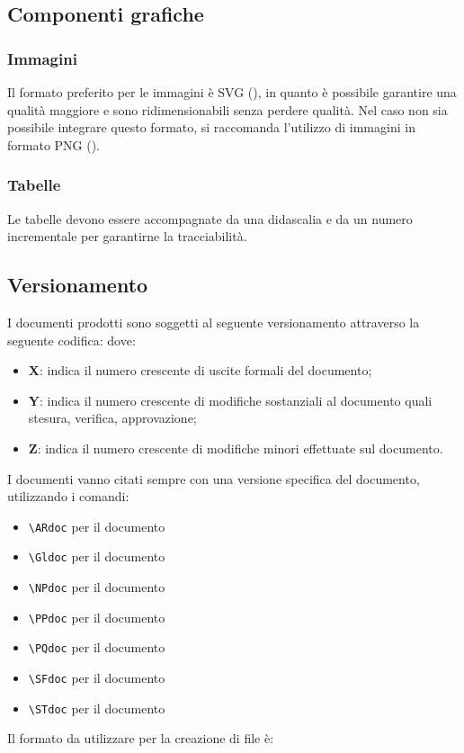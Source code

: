 	\subsection{Componenti grafiche}		
		\subsubsection{Immagini}
		Il formato preferito per le immagini è SVG (), in quanto è possibile garantire una qualità maggiore e sono ridimensionabili senza perdere qualità. Nel caso non sia possibile integrare questo formato, si raccomanda l'utilizzo di immagini in formato PNG ().
		\subsubsection{Tabelle}
		Le tabelle devono essere accompagnate da una didascalia e da un numero incrementale per garantirne la tracciabilità.
	
	\subsection{Versionamento}
	I documenti prodotti sono soggetti al seguente versionamento attraverso la seguente codifica:
	dove:
	\begin{itemize}
		\item \textbf{X}: indica il numero crescente di uscite formali del documento;
		\item \textbf{Y}: indica il numero crescente di modifiche sostanziali al documento quali stesura, verifica, approvazione;
		\item \textbf{Z}: indica il numero crescente di modifiche minori effettuate sul documento.
	\end{itemize}
	I documenti vanno citati sempre con una versione specifica del documento, utilizzando i comandi:
	\begin{itemize}
	\item \texttt{\textbackslash ARdoc} per il documento \ARdoc
	\item \texttt{\textbackslash Gldoc} per il documento \Gldoc
	\item \texttt{\textbackslash NPdoc} per il documento \NPdoc
	\item \texttt{\textbackslash PPdoc} per il documento \PPdoc
	\item \texttt{\textbackslash PQdoc} per il documento \PQdoc
	\item \texttt{\textbackslash SFdoc} per il documento \SFdoc
	\item \texttt{\textbackslash STdoc} per il documento \STdoc
	\end{itemize}
	Il formato da utilizzare per la creazione di file è:
